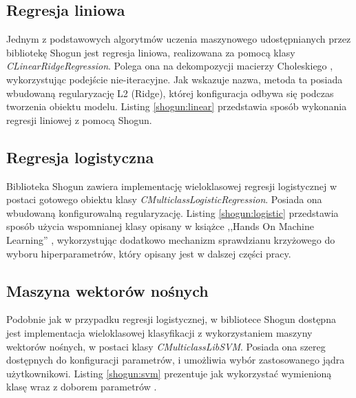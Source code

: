\subsection{Regresja liniowa}
Jednym z podstawowych algorytmów uczenia maszynowego udostępnianych przez bibliotekę Shogun jest regresja liniowa, realizowana za pomocą klasy \textit{CLinearRidgeRegression}. Polega ona na dekompozycji macierzy Choleskiego \cite{handsOnMachineLearning}, wykorzystując podejście nie-iteracyjne. Jak wskazuje nazwa, metoda ta posiada wbudowaną regularyzację L2 (Ridge), której konfiguracja odbywa się podczas tworzenia obiektu modelu. Listing \ref{shogun:linear} przedstawia sposób wykonania regresji liniowej z pomocą Shogun.


\subsection{Regresja logistyczna}
Biblioteka Shogun zawiera implementację wieloklasowej regresji logistycznej w postaci gotowego obiektu klasy \textit{CMulticlassLogisticRegression}. Posiada ona wbudowaną konfigurowalną regularyzację. Listing \ref{shogun:logistic} przedstawia sposób użycia wspomnianej klasy opisany w książce ,,Hands On Machine Learning'' \cite{handsOnMachineLearning}, wykorzystując dodatkowo mechanizm sprawdzianu krzyżowego do wyboru hiperparametrów, który opisany jest w dalszej części pracy.


\subsection{Maszyna wektorów nośnych}
Podobnie jak w przypadku regresji logistycznej, w bibliotece Shogun dostępna jest implementacja wieloklasowej klasyfikacji z wykorzystaniem maszyny wektorów nośnych, w postaci klasy \textit{CMulticlassLibSVM}. Posiada ona szereg dostępnych do konfiguracji parametrów, i umożliwia wybór zastosowanego jądra użytkownikowi. Listing \ref{shogun:svm} prezentuje jak wykorzystać wymienioną klasę wraz z doborem parametrów \cite{handsOnMachineLearning}.


